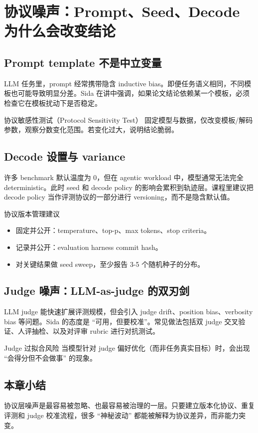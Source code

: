\section{协议噪声：Prompt、Seed、Decode 为什么会改变结论}

\subsection{Prompt template 不是中立变量}
LLM 任务里，prompt 经常携带隐含 inductive bias。即便任务语义相同，不同模板也可能导致明显分差。Sida 在讲中强调，如果论文结论依赖某一个模板，必须检查它在模板扰动下是否稳定。

\begin{knowledgebox}{协议敏感性测试（Protocol Sensitivity Test）}
固定模型与数据，仅改变模板/解码参数，观察分数变化范围。若变化过大，说明结论脆弱。
\end{knowledgebox}

\subsection{Decode 设置与 variance}
许多 benchmark 默认温度为 0，但在 agentic workload 中，模型通常无法完全 deterministic。此时 seed 和 decode policy 的影响会累积到轨迹层。课程里建议把 decode policy 当作评测协议的一部分进行 versioning，而不是隐含默认值。

\begin{importantbox}{协议版本管理建议}
\begin{itemize}
    \item 固定并公开：temperature、top-p、max tokens、stop criteria。
    \item 记录并公开：evaluation harness commit hash。
    \item 对关键结果做 seed sweep，至少报告 3-5 个随机种子的分布。
\end{itemize}
\end{importantbox}

\subsection{Judge 噪声：LLM-as-judge 的双刃剑}
LLM judge 能快速扩展评测规模，但会引入 judge drift、position bias、verbosity bias 等问题。Sida 的态度是 ``可用，但要校准''。常见做法包括双 judge 交叉验证、人评抽检、以及对评审 rubric 进行对抗测试。

\begin{warningbox}{Judge 过拟合风险}
当模型针对 judge 偏好优化（而非任务真实目标）时，会出现 ``会得分但不会做事'' 的现象。
\end{warningbox}

\subsection{本章小结}
协议层噪声是最容易被忽略、也最容易被治理的一层。只要建立版本化协议、重复评测和 judge 校准流程，很多 ``神秘波动'' 都能被解释为协议差异，而非能力突变。

